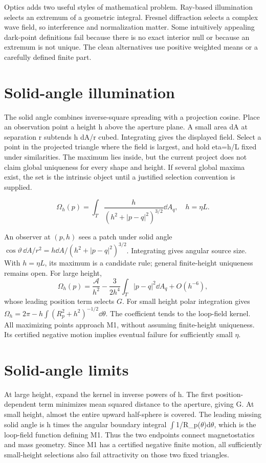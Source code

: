 \documentclass[11pt,oneside,openany]{book}
\begin{document}
Optics adds two useful styles of mathematical problem. Ray-based illumination selects an extremum of a geometric integral. Fresnel diffraction selects a complex wave field, so interference and normalization matter. Some intuitively appealing dark-point definitions fail because there is no exact interior null or because an extremum is not unique. The clean alternatives use positive weighted means or a carefully defined finite part.


\section{Solid-angle illumination}\label{sec:slide77}

The solid angle combines inverse-square spreading with a projection cosine. Place an observation point a height h above the aperture plane. A small area dA at separation r subtends h dA/r cubed. Integrating gives the displayed field. Select a point in the projected triangle where the field is largest, and hold eta=h/L fixed under similarities. The maximum lies inside, but the current project does not claim global uniqueness for every shape and height. If several global maxima exist, the set is the intrinsic object until a justified selection convention is supplied.


\[\Omega_h(p)=\int_T\frac{h}{(h^2+|p-q|^2)^{3/2}}\dd A_q,\quad h=\eta L.\]



An observer at $(p,h)$ sees a patch under solid angle
$\cos\vartheta\,\dd A/r^2=h\dd A/(h^2+|p-q|^2)^{3/2}$.
Integrating gives angular source size. With $h=\eta L$, its maximum
is a candidate rule; general finite-height uniqueness remains open.
For large height,
\[
\Omega_h(p)=\frac{\mathcal A}{h^2}
-\frac3{2h^4}\int_T|p-q|^2\dd A_q+O(h^{-6}),
\]
whose leading position term selects $G$.
For small height polar integration gives
$\Omega_h=2\pi-h\int(R_p^2+h^2)^{-1/2}\dd\theta$.
The coefficient tends to the loop-field kernel.
All maximizing points approach M1, without assuming finite-height
uniqueness. Its certified negative motion implies eventual failure
for sufficiently small $\eta$.




\section{Solid-angle limits}\label{sec:slide78}

At large height, expand the kernel in inverse powers of h. The first position-dependent term minimizes mean squared distance to the aperture, giving G. At small height, almost the entire upward half-sphere is covered. The leading missing solid angle is h times the angular boundary integral \ensuremath{\int}1/R\_p(\ensuremath{\theta})d\ensuremath{\theta}, which is the loop-field function defining M1. Thus the two endpoints connect magnetostatics and mass geometry. Since M1 has a certified negative finite motion, all sufficiently small-height selections also fail attractivity on those two fixed triangles.
\end{document}
